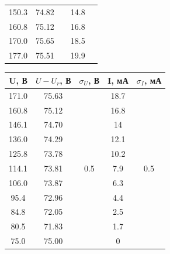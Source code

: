 \documentclass[14pt, a4paper,reqno]{article}
\begin{document}
\begin{minipage}{0.49\linewidth}
\begin{center}
\begin{tabular}{|c|c|c|c|c|}
            150.3   & 74.82      &                       & 14.8  &                       \\ \hhline{--~-~}
            160.8   & 75.12      &                       & 16.8  &                       \\ \hhline{--~-~}
            170.0   & 75.65      &                       & 18.5  &                       \\ \hhline{--~-~}
            177.0   & 75.51      &                       & 19.9  &                       \\ \hline
        \end{tabular}
    \end{center}
    \end{minipage}
    \hfill
    \begin{minipage}{0.49\linewidth}
    \begin{center}
        \begin{tabular}{|c|c|c|c|c|}
            \hline
            U, В    & $U - U_r$, В & $\sigma_U$, В         & I, мА & $\sigma_I$, мА     \\ \hline
            \hline
            171.0   & 75.63     & \multirow{11}{*}{0.5} & 18.7  & \multirow{11}{*}{0.5} \\ \hhline{--~-~}
            160.8   & 75.12     &                       & 16.8  &                       \\ \hhline{--~-~}
            146.1   & 74.70     &                       & 14    &                       \\ \hhline{--~-~}
            136.0   & 74.29     &                       & 12.1  &                       \\ \hhline{--~-~}
            125.8   & 73.78     &                       & 10.2  &                       \\ \hhline{--~-~}
            114.1   & 73.81     &                       & 7.9   &                       \\ \hhline{--~-~}
            106.0   & 73.87     &                       & 6.3   &                       \\ \hhline{--~-~}
            95.4    & 72.96     &                       & 4.4   &                       \\ \hhline{--~-~}
            84.8    & 72.05     &                       & 2.5   &                       \\ \hhline{--~-~}
            80.5    & 71.83     &                       & 1.7   &                       \\ \hhline{--~-~}
            75.0    & 75.00     &                       & 0     &                       \\ \hline
        \end{tabular}
    \end{center}
    \end{minipage}
\end{document}
